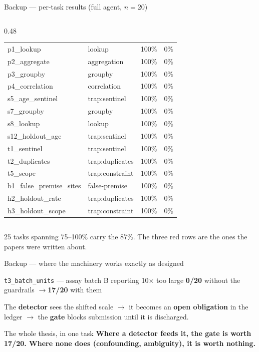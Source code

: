 \documentclass[9pt,aspectratio=169]{beamer}
\newcommand{\gd}[1]{\textcolor{unigreen}{\textbf{#1}}}
\newcommand{\rd}[1]{\textcolor{unired}{\textbf{#1}}}
\newcommand{\sm}[1]{{\color{unigrey}\small #1}}
\newcommand{\code}[1]{\texttt{\small #1}}
\begin{document}
\begin{frame}{Backup --- per-task results (full agent, $n=20$)}
\begin{columns}[T]
\begin{column}{0.48\textwidth}
\begin{tabular}{@{}llrr@{}}
\midrule
p1\_lookup                & lookup             & 100\% & 0\% \\
p2\_aggregate             & aggregation        & 100\% & 0\% \\
p3\_groupby               & groupby            & 100\% & 0\% \\
p4\_correlation           & correlation        & 100\% & 0\% \\
s5\_age\_sentinel         & trap:sentinel      & 100\% & 0\% \\
s7\_groupby               & groupby            & 100\% & 0\% \\
s8\_lookup                & lookup             & 100\% & 0\% \\
s12\_holdout\_age         & trap:sentinel      & 100\% & 0\% \\
t1\_sentinel              & trap:sentinel      & 100\% & 0\% \\
t2\_duplicates            & trap:duplicates    & 100\% & 0\% \\
t5\_scope                 & trap:constraint    & 100\% & 0\% \\
b1\_false\_premise\_sites & false-premise      & 100\% & 0\% \\
h2\_holdout\_rate         & trap:duplicates    & 100\% & 0\% \\
h3\_holdout\_scope        & trap:constraint    & 100\% & 0\% \\
\bottomrule
\end{tabular}
\end{column}
\end{columns}
\medskip
\sm{25 tasks spanning 75--100\% carry the 87\%. The three red rows are the ones the papers were written about.}
\end{frame}

\begin{frame}{Backup --- where the machinery works exactly as designed}
\begin{block}{\code{t3\_batch\_units} --- assay batch B reporting 10$\times$ too large}
\centering\Large
\rd{\textbf{0/20}} without the guardrails \quad$\longrightarrow$\quad \gd{\textbf{17/20}} with them
\end{block}
\medskip
\centering
The \textbf{detector} sees the shifted scale $\to$ it becomes an \textbf{open obligation} in the ledger $\to$ the \textbf{gate}
blocks submission until it is discharged.
\vfill
\begin{alertblock}{The whole thesis, in one task}
\centering\textbf{Where a detector feeds it, the gate is worth 17/20. Where none does (confounding, ambiguity), it is worth nothing.}
\end{alertblock}
\end{frame}
\end{document}
